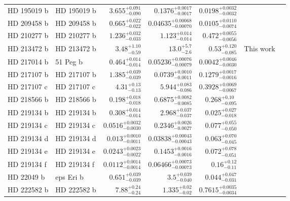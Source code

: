 \begin{longtable*}{llrrrrr}
HD 195019 b & HD 195019 b & $3.655^{+0.091}_{-0.090}$ & $0.1376^{+0.0017}_{-0.0017}$ & $0.0198^{+0.0032}_{-0.0032}$ & \cite{Fischer99} & \\
HD 209458 b & HD 209458 b & $0.665^{+0.022}_{-0.022}$ & $0.04635^{+0.00068}_{-0.00070}$ & $0.0105^{+0.0110}_{-0.0074}$ & \cite{Henry00} & \\
HD 210277 b & HD 210277 b & $1.236^{+0.032}_{-0.033}$ & $1.123^{+0.014}_{-0.014}$ & $0.472^{+0.0055}_{-0.0056}$ & \cite{Marcy99} & \\
HD 213472 b & HD 213472 b & $3.48^{+1.10}_{-0.59}$ & $13.0^{+5.7}_{-2.6}$ & $0.53^{+0.120}_{-0.085}$ & This work & \\
HD 217014 b & 51 Peg b & $0.464^{+0.014}_{-0.014}$ & $0.05236^{+0.00076}_{-0.00079}$ & $0.0042^{+0.0046}_{-0.0030}$ & \cite{Mayor95} & \\
HD 217107 b & HD 217107 b & $1.385^{+0.039}_{-0.039}$ & $0.0739^{+0.0010}_{-0.0011}$ & $0.1279^{+0.0017}_{-0.0016}$ & \cite{Vogt05} & \\
HD 217107 c & HD 217107 c & $4.31^{+0.13}_{-0.13}$ & $5.944^{+0.083}_{-0.086}$ & $0.3928^{+0.0069}_{-0.0067}$ & \cite{Vogt05} & \\
HD 218566 b & HD 218566 b & $0.198^{+0.018}_{-0.018}$ & $0.6875^{+0.0082}_{-0.0085}$ & $0.268^{+0.10}_{-0.095}$ & \cite{Meschiari11} & \\
HD 219134 b & HD 219134 b & $0.308^{+0.014}_{-0.014}$ & $2.968^{+0.037}_{-0.037}$ & $0.025^{+0.027}_{-0.018}$ & \cite{Vogt15} & \\
HD 219134 c & HD 219134 c & $0.0516^{+0.0032}_{-0.0030}$ & $0.2346^{+0.0026}_{-0.0027}$ & $0.077^{+0.055}_{-0.050}$ & \cite{Vogt15} & \\
HD 219134 d & HD 219134 d & $0.013^{+0.0010}_{-0.0011}$ & $0.03838^{+0.00043}_{-0.00043}$ & $0.063^{+0.070}_{-0.045}$ & \cite{Vogt15} & \\
HD 219134 e & HD 219134 e & $0.0243^{+0.0023}_{-0.0022}$ & $0.1453^{+0.0016}_{-0.0016}$ & $0.072^{+0.078}_{-0.051}$ & \cite{Vogt15} & \\
HD 219134 f & HD 219134 f & $0.0112^{+0.0014}_{-0.0014}$ & $0.06466^{+0.00073}_{-0.00073}$ & $0.16^{+0.12}_{-0.11}$ & \cite{Vogt15} & \\
HD 22049 b & eps Eri b & $0.651^{+0.039}_{-0.039}$ & $3.5^{+0.039}_{-0.040}$ & $0.044^{+0.047}_{-0.031}$ & \cite{Hatzes00} & \\
HD 222582 b & HD 222582 b & $7.88^{+0.24}_{-0.24}$ & $1.335^{+0.02}_{-0.02}$ & $0.7615^{+0.0035}_{-0.0034}$ & \cite{Vogt00} & \\

\end{longtable*}
